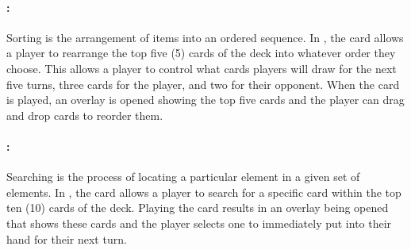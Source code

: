 \paragraph{\Sortns:}
Sorting is the arrangement of items into an ordered sequence. In \pwTwoNS, the \Sort card allows a player to rearrange the top five (5) cards of the deck into whatever order they choose. This allows a player to control what cards players will draw for the next five turns, three cards for the player, and two for their opponent. When the card is played, an overlay is opened showing the top five cards and the player can drag and drop cards to reorder them.

\paragraph{\Serns:}
Searching is the process of locating a particular element in a given set of elements. In \pwTwoNS, the \Ser card allows a player to search for a specific card within the top ten (10) cards of the deck. Playing the card results in an overlay being opened that shows these cards and the player selects one to immediately put into their hand for their next turn.

